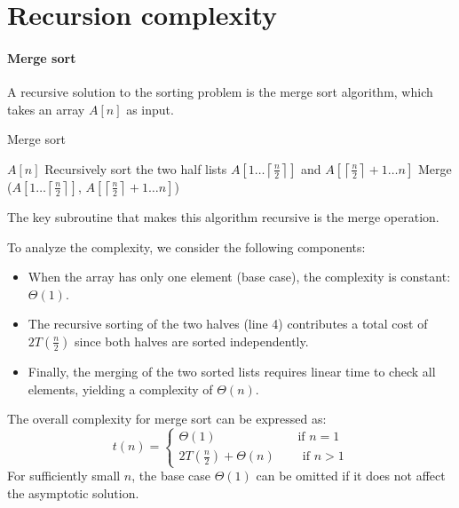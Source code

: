 \section{Recursion complexity}

\paragraph*{Merge sort}
A recursive solution to the sorting problem is the merge sort algorithm, which takes an array $A[n]$ as input.
\begin{algorithm}[H]
    \caption{Merge sort}
        \begin{algorithmic}[1]
                \State\Return $A[n]$
            \EndIf
            \State Recursively sort the two half lists $A\left[1\ldots\left\lceil \frac{n}{2}\right\rceil \right]$ and $A\left[\left\lceil \frac{n}{2}\right\rceil + 1 \ldots n\right]$
            \State Merge ($A\left[1\ldots\left\lceil \frac{n}{2}\right\rceil \right]$, $A\left[\left\lceil \frac{n}{2}\right\rceil + 1 \ldots n\right]$)
        \end{algorithmic}
\end{algorithm}
The key subroutine that makes this algorithm recursive is the merge operation.

To analyze the complexity, we consider the following components:
\begin{itemize}
    \item When the array has only one element (base case), the complexity is constant: $\Theta(1)$. 
    \item The recursive sorting of the two halves (line 4) contributes a total cost of $2T\left(\frac{n}{2}\right)$ since both halves are sorted independently. 
    \item Finally, the merging of the two sorted lists requires linear time to check all elements, yielding a complexity of $\Theta(n)$. 
\end{itemize}
The overall complexity for merge sort can be expressed as:
\[t(n)=\begin{cases} \Theta(1)\qquad\qquad\qquad\: \text{ if }n=1 \\ 2T\left(\frac{n}{2}\right) + \Theta(n)\qquad\:\text{if }n>1 \end{cases}\]
For sufficiently small $n$, the base case $\Theta(1)$ can be omitted if it does not affect the asymptotic solution.

